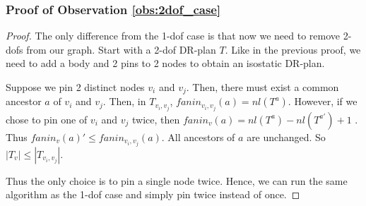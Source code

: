 \subsubsection{Proof of Observation \ref{obs:2dof_case}}
\begin{proof}
    The only difference from the 1-dof case is that now we need to remove
2-dofs from our graph. Start with a 2-dof DR-plan $T$. Like in the previous proof, we need to add a body and 2 pins to 2 nodes to obtain an isostatic DR-plan.

    Suppose we pin 2 distinct nodes $v_i$ and $v_j$. Then, there must exist a common ancestor $a$ of $v_i$ and $v_j$. Then, in $T_{v_i,v_j}$, $fanin_{v_i,v_j}(a) = nl(T^a)$. However, if we chose to pin one of $v_i$ and $v_j$ twice, then $fanin_v(a) = nl(T^a) - nl(T^{a'}) +1$ . Thus $fanin_v(a)' \leq fanin_{v_i,v_j}(a)$. All ancestors of $a$ are unchanged. So $|T_v| \leq |T_{v_i,v_j}|$.

    Thus the only choice is to pin a single node twice. Hence, we can run the same algorithm as the 1-dof case and simply pin twice instead of once.
\end{proof}


